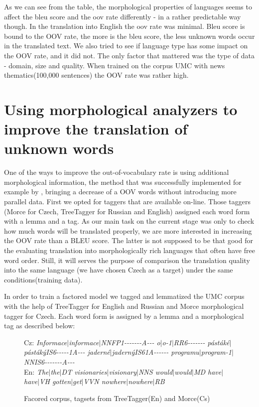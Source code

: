 \documentclass[11pt,letterpaper]{article}
\begin{document}
As we can see from the table, the morphological properties of languages seems to
affect the bleu score and the oov rate differently - in a rather predictable way though.
In the translation into English the oov rate was minimal. 
Bleu score is bound to the OOV rate, the more is the bleu  score, the less unknown words occur 
in the translated text.
We also tried to see if language type has some impact on the OOV rate, and it did not.
The only factor that mattered was the type of data - domain, size and quality. When 
trained on the corpus UMC with news thematics(100,000 sentences) the OOV rate was rather high.

\section{Using morphological analyzers to improve the translation of unknown words}

One of the ways to improve the out-of-vocabulary rate is using additional morphological
information, the method that was successfully implemented for example by \cite{turchi},
bringing a decrease of a OOV words without introducing more parallel data.
 First we opted for taggers that are available  on-line. Those taggers
(Morce for Czech, TreeTagger for Russian and English) assigned each word form with
a lemma and a tag. As our main task on the current stage was only to check
how much words will be translated properly, we are more interested in increasing
the OOV rate than a BLEU score. The latter is not supposed to be that 
good for the evaluating translation into morphologically rich languages that often have
free word order. Still, it will serves the purpose of comparison the translation 
quality into the same language (we have chosen Czech as a target) under the same conditions(training data).

In order to train a factored model we tagged and lemmatized the UMC corpus with
the help of TreeTagger %
for English and Russian and Morce
morphological tagger for Czech. %
Each word form is assigned by a lemma and a morphological tag as described below:

\begin{figure}
Cz: \textit{Informace$|$informace$|$NNFP1-{}-{}-{}-{}-{}-{}-A-{}-{}- o$|$o-1$|$RR6-{}-{}-{}-{}-{}-{}- 
pástáké$|$pástákýIS6-{}-{}-{}-{}-1A-{}-{}- jaderné$|$jadernýIS61A-{}-{}-{}-{}-{}- 
programu$|$program-1$|$NNIS6-{}-{}-{}-{}-{}-{}-A-{}-{}-}\\
En: \textit{The$|$the$|$DT visionaries$|$visionary$|$NNS would$|$would$|$MD have$|$have$|$VH gotten$|$get$|$VVN nowhere$|$nowhere$|$RB}
\caption{Facored corpus, tagsets from TreeTagger(En) and Morce(Cs)}
\label{fig:fact}
\end{figure}
\end{document}
